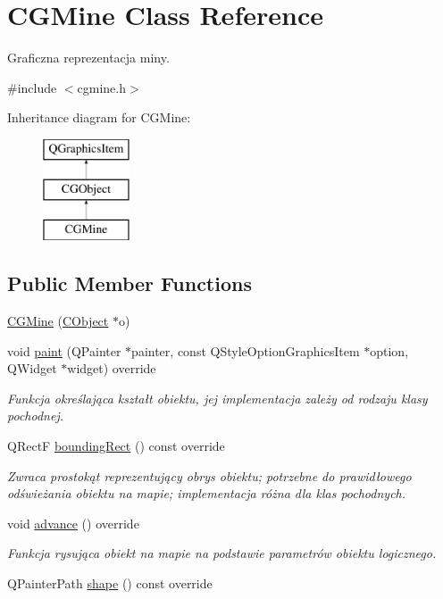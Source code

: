 \hypertarget{class_c_g_mine}{}\section{C\+G\+Mine Class Reference}
\label{class_c_g_mine}


Graficzna reprezentacja miny.  




{\ttfamily \#include $<$cgmine.\+h$>$}

Inheritance diagram for C\+G\+Mine\+:\begin{figure}[H]
\begin{center}
\leavevmode
\includegraphics[height=3.000000cm]{class_c_g_mine}
\end{center}
\end{figure}
\subsection*{Public Member Functions}
\begin{DoxyCompactItemize}
\item 
\mbox{\hyperlink{class_c_g_mine_a2112f99209203ed64e398a2e358eb1cb}{C\+G\+Mine}} (\mbox{\hyperlink{class_c_object}{C\+Object}} $\ast$o)
\item 
void \mbox{\hyperlink{class_c_g_mine_a2a48415eeb9f9e662a068abd09f30b00}{paint}} (Q\+Painter $\ast$painter, const Q\+Style\+Option\+Graphics\+Item $\ast$option, Q\+Widget $\ast$widget) override
\begin{DoxyCompactList}\small\item\em Funkcja określająca kształt obiektu, jej implementacja zależy od rodzaju klasy pochodnej. \end{DoxyCompactList}\item 
Q\+RectF \mbox{\hyperlink{class_c_g_mine_ad11ed34f5cd02b51fd2baeaf700daba2}{bounding\+Rect}} () const override
\begin{DoxyCompactList}\small\item\em Zwraca prostokąt reprezentujący obrys obiektu; potrzebne do prawidłowego odświeżania obiektu na mapie; implementacja różna dla klas pochodnych. \end{DoxyCompactList}\item 
void \mbox{\hyperlink{class_c_g_mine_a6dbd841b39f421054cd8db54c3c84b74}{advance}} () override
\begin{DoxyCompactList}\small\item\em Funkcja rysująca obiekt na mapie na podstawie parametrów obiektu logicznego. \end{DoxyCompactList}\item 
Q\+Painter\+Path \mbox{\hyperlink{class_c_g_mine_aa0a9b3d1b7a092121033d2e2f519c09a}{shape}} () const override
\end{DoxyCompactItemize}
